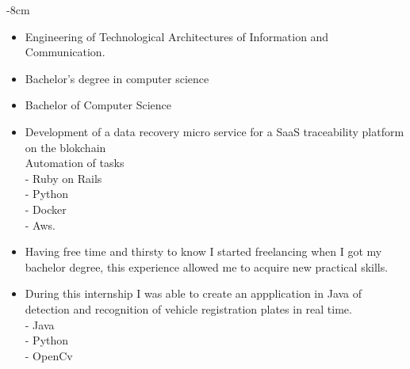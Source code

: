 \documentclass[10pt,a4paper]{altacv}
\begin{document}
\begin{adjustwidth}{}{-8cm}
\makecvheader
\end{adjustwidth}
\marginpar{\vspace*{\dimexpr1pt-\baselineskip}\raggedright}
 {}
\begin{itemize}
	\item Engineering of Technological Architectures of Information and Communication. 
\end{itemize}
 {}
\begin{itemize}
	\item Bachelor's degree in computer science 
\end{itemize}
 {}
\begin{itemize}
	\item Bachelor of Computer Science 
\end{itemize}
 {}
\begin{itemize}
	\item Development of a data recovery micro service for a SaaS traceability platform on the blokchain \\ Automation of tasks \\ - Ruby on Rails \\ - Python \\ - Docker \\ - Aws. 
\end{itemize}
 {}
\begin{itemize}
	\item Having free time and thirsty to know I started freelancing when I got my bachelor degree, this experience allowed me to acquire new practical skills. 
\end{itemize}
 {}
\begin{itemize}
	\item During this internship I was able to create an appplication in Java of detection and recognition of vehicle registration plates in real time. \\- Java \\- Python \\- OpenCv 
\end{itemize}
\end{document}
